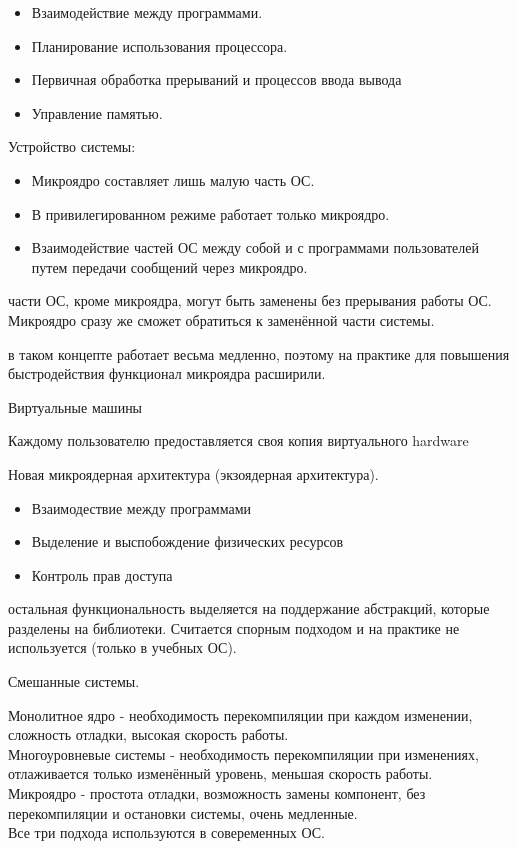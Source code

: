 \documentclass[12pt, a4paper]{article}
\newcommand{\mytab}{\hspace{0.5cm}}
\begin{document}
    \begin{itemize}
        \item Взаимодействие между программами.
        \item Планирование использования процессора.
        \item Первичная обработка прерываний и процессов ввода вывода
        \item Управление памятью.
    \end{itemize}
    Устройство системы:
    \begin{itemize}
        \item Микроядро составляет лишь малую часть ОС.
        \item В привилегированном режиме работает только микроядро.
        \item Взаимодействие частей ОС между собой и с программами пользователей путем передачи сообщений через микроядро.
    \end{itemize}
     части ОС, кроме микроядра, могут быть заменены без прерывания работы ОС. Микроядро сразу же сможет обратиться 
    к заменённой части системы.\par
     в таком концепте работает весьма медленно, поэтому на практике для повышения быстродействия функционал микроядра расширили.
    \begin{center}
        Виртуальные машины
    \end{center}
    Каждому пользователю предоставляется своя копия виртуального hardware
    \begin{center}
        Новая микроядерная архитектура (экзоядерная архитектура).
    \end{center}
    \begin{itemize}
        \item Взаимодествие между программами 
        \item Выделение и выспобождение физических ресурсов 
        \item Контроль прав доступа
    \end{itemize} 
     остальная функциональность выделяется на поддержание абстракций, которые разделены на библиотеки. 
    Считается спорным подходом и на практике не используется (только в учебных ОС).
    \begin{center}
        Смешанные системы.
    \end{center} 
    Монолитное ядро - необходимость перекомпиляции при каждом изменении, сложность отладки, высокая скорость работы.\\
    Многоуровневые системы - необходимость перекомпиляции при изменениях, отлаживается только изменённый уровень, меньшая скорость работы.\\
    Микроядро - простота отладки, возможность замены компонент, без перекомпиляции и остановки системы, очень медленные.\\
    Все три подхода используются в совеременных ОС.
\end{document}
